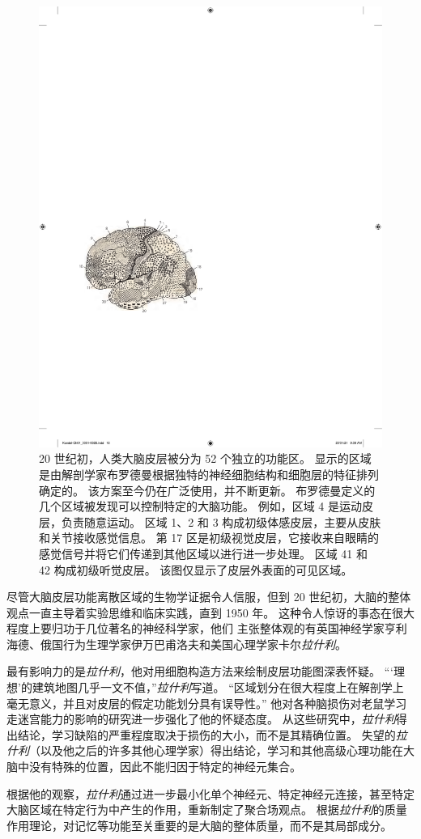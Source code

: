 \begin{figure}[htbp]
	\centering
	\includegraphics[width=0.6\linewidth]{chap01/fig_1_7}
	\caption{20 世纪初，人类大脑皮层被分为 52 个独立的功能区。
		显示的区域是由解剖学家布罗德曼根据独特的神经细胞结构和细胞层的特征排列确定的。
		该方案至今仍在广泛使用，并不断更新。
		布罗德曼定义的几个区域被发现可以控制特定的大脑功能。
		例如，区域 4 是运动皮层，负责随意运动。
		区域 1、2 和 3 构成初级体感皮层，主要从皮肤和关节接收感觉信息。
		第 17 区是初级视觉皮层，它接收来自眼睛的感觉信号并将它们传递到其他区域以进行进一步处理。
		区域 41 和 42 构成初级听觉皮层。
		该图仅显示了皮层外表面的可见区域。}
	\label{fig:1_7}
\end{figure}


尽管大脑皮层功能离散区域的生物学证据令人信服，但到 20 世纪初，大脑的整体观点一直主导着实验思维和临床实践，直到 1950 年。
这种令人惊讶的事态在很大程度上要归功于几位著名的神经科学家，他们 主张整体观的有英国神经学家亨利海德、俄国行为生理学家伊万巴甫洛夫和美国心理学家卡尔\textit{拉什利}。


最有影响力的是\textit{拉什利}，他对用细胞构造方法来绘制皮层功能图深表怀疑。
“‘理想’的建筑地图几乎一文不值，”\textit{拉什利}写道。
“区域划分在很大程度上在解剖学上毫无意义，并且对皮层的假定功能划分具有误导性。” 
他对各种脑损伤对老鼠学习走迷宫能力的影响的研究进一步强化了他的怀疑态度。
从这些研究中，\textit{拉什利}得出结论，学习缺陷的严重程度取决于损伤的大小，而不是其精确位置。
失望的\textit{拉什利}（以及他之后的许多其他心理学家）得出结论，学习和其他高级心理功能在大脑中没有特殊的位置，因此不能归因于特定的神经元集合。


根据他的观察，\textit{拉什利}通过进一步最小化单个神经元、特定神经元连接，甚至特定大脑区域在特定行为中产生的作用，重新制定了聚合场观点。
根据\textit{拉什利}的质量作用理论，对记忆等功能至关重要的是大脑的整体质量，而不是其局部成分。


